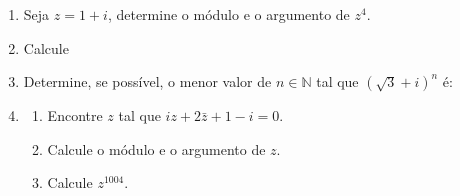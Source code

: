 \documentclass[a4paper,5pt]{amsbook}
\begin{document}
\vspace{1cm}
\begin{enumerate}
	\vspace{0.5cm}
	\item Seja $z=1+i$, determine o módulo e o argumento de $z^4$.

	\vspace{0.5cm}
	\item Calcule


	\vspace{0.5cm}
	\item Determine, se possível, o menor valor de $n\in\mathbb{N}$ tal que ${(\sqrt{3}+i)}^n$ é:


	\vspace{0.5cm}
	\item
		\begin{enumerate}
			\item Encontre $z$ tal que $iz+2\bar{z} + 1 - i = 0$.
			\item Calcule o módulo e o argumento de $z$.
			\item Calcule $z^{1004}$.
		\end{enumerate}


\end{enumerate}
\end{document}
